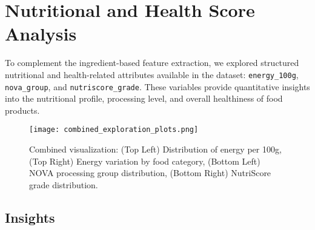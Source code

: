 \documentclass[11pt]{article}
\begin{document}
\section{Nutritional and Health Score Analysis}

To complement the ingredient-based feature extraction, we explored structured nutritional and health-related attributes available in the dataset: \texttt{energy\_100g}, \texttt{nova\_group}, and \texttt{nutriscore\_grade}. These variables provide quantitative insights into the nutritional profile, processing level, and overall healthiness of food products.

\begin{figure}[h!]
    \centering
    \texttt{[image: combined\_exploration\_plots.png]}
    \caption{Combined visualization: (Top Left) Distribution of energy per 100g, (Top Right) Energy variation by food category, (Bottom Left) NOVA processing group distribution, (Bottom Right) NutriScore grade distribution.}
    \label{fig:combined_nutrition}
\end{figure}

\subsection*{Insights}
\end{document}
